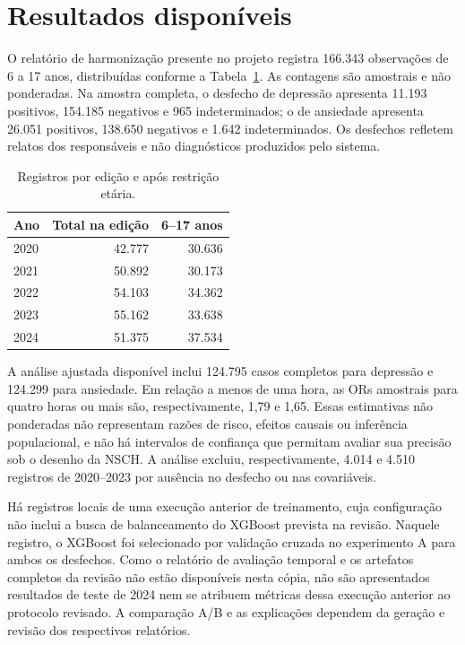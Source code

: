 \documentclass[12pt]{article}
\begin{document}
\section{Resultados disponíveis}
O relatório de harmonização presente no projeto registra 166.343 observações de 6 a 17 anos, distribuídas conforme a Tabela~\ref{tab:amostra}. As contagens são amostrais e não ponderadas. Na amostra completa, o desfecho de depressão apresenta 11.193 positivos, 154.185 negativos e 965 indeterminados; o de ansiedade apresenta 26.051 positivos, 138.650 negativos e 1.642 indeterminados. Os desfechos refletem relatos dos responsáveis e não diagnósticos produzidos pelo sistema.

\begin{table}[ht]
\centering
\caption{Registros por edição e após restrição etária.}
\label{tab:amostra}
\begin{tabular}{lrr}
\hline
Ano & Total na edição & 6--17 anos \\
\hline
2020 & 42.777 & 30.636 \\
2021 & 50.892 & 30.173 \\
2022 & 54.103 & 34.362 \\
2023 & 55.162 & 33.638 \\
2024 & 51.375 & 37.534 \\
\hline
\end{tabular}
\end{table}

A análise ajustada disponível inclui 124.795 casos completos para depressão e 124.299 para ansiedade. Em relação a menos de uma hora, as ORs amostrais para quatro horas ou mais são, respectivamente, 1,79 e 1,65. Essas estimativas não ponderadas não representam razões de risco, efeitos causais ou inferência populacional, e não há intervalos de confiança que permitam avaliar sua precisão sob o desenho da NSCH. A análise excluiu, respectivamente, 4.014 e 4.510 registros de 2020--2023 por ausência no desfecho ou nas covariáveis.

Há registros locais de uma execução anterior de treinamento, cuja configuração não inclui a busca de balanceamento do XGBoost prevista na revisão. Naquele registro, o XGBoost foi selecionado por validação cruzada no experimento A para ambos os desfechos. Como o relatório de avaliação temporal e os artefatos completos da revisão não estão disponíveis nesta cópia, não são apresentados resultados de teste de 2024 nem se atribuem métricas dessa execução anterior ao protocolo revisado. A comparação A/B e as explicações dependem da geração e revisão dos respectivos relatórios.
\end{document}
